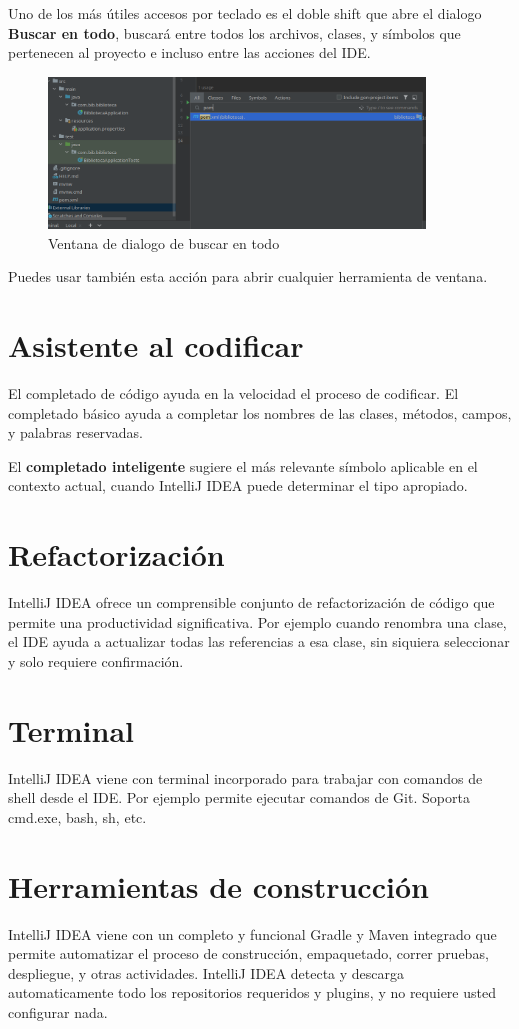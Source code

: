Uno de los más útiles accesos por teclado es el doble shift que abre el dialogo \textbf{Buscar en todo}, buscará entre todos los archivos, clases, y símbolos que pertenecen al proyecto e incluso entre las acciones del IDE. 
\begin{figure}[h]
\centering
\includegraphics[width=10cm]{images/idea3}
\caption{Ventana de dialogo de buscar en todo}
\end{figure}
Puedes usar también esta acción para abrir cualquier herramienta de ventana. 

\section{Asistente al codificar}
El completado de código ayuda en la velocidad el proceso de codificar. El completado básico ayuda a completar los nombres de las clases, métodos, campos, y palabras reservadas.

El \textbf{completado inteligente} sugiere el más relevante símbolo aplicable en el contexto actual, cuando IntelliJ IDEA puede determinar el tipo apropiado. 
\section{Refactorización}
IntelliJ IDEA ofrece un comprensible conjunto de refactorización de código que permite una productividad significativa. Por ejemplo cuando renombra una clase, el IDE ayuda a actualizar todas las referencias a esa clase, sin siquiera seleccionar y solo requiere confirmación. 
\section{Terminal}
IntelliJ IDEA viene con terminal incorporado para trabajar con comandos de shell desde el IDE. Por ejemplo permite ejecutar comandos de Git. Soporta cmd.exe, bash, sh, etc. 
\section{Herramientas de construcción}
IntelliJ IDEA viene con un completo y funcional Gradle y Maven integrado que permite automatizar el proceso de construcción, empaquetado, correr pruebas, despliegue, y otras actividades. IntelliJ IDEA detecta y descarga automaticamente todo los repositorios requeridos y plugins, y no requiere usted configurar nada. 
